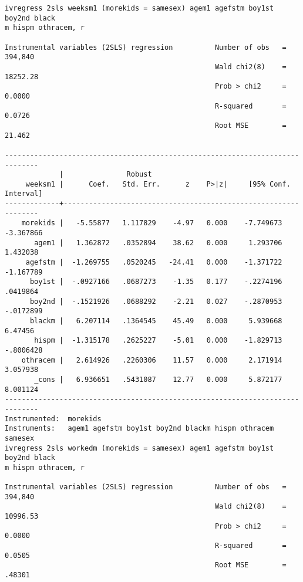 \documentclass[11pt]{article}
\begin{document}
\begin{verbatim}
ivregress 2sls weeksm1 (morekids = samesex) agem1 agefstm boy1st boy2nd black
m hispm othracem, r

Instrumental variables (2SLS) regression          Number of obs   =    394,840
                                                  Wald chi2(8)    =   18252.28
                                                  Prob > chi2     =     0.0000
                                                  R-squared       =     0.0726
                                                  Root MSE        =     21.462

------------------------------------------------------------------------------
             |               Robust
     weeksm1 |      Coef.   Std. Err.      z    P>|z|     [95% Conf. Interval]
-------------+----------------------------------------------------------------
    morekids |   -5.55877   1.117829    -4.97   0.000    -7.749673   -3.367866
       agem1 |   1.362872   .0352894    38.62   0.000     1.293706    1.432038
     agefstm |  -1.269755   .0520245   -24.41   0.000    -1.371722   -1.167789
      boy1st |  -.0927166   .0687273    -1.35   0.177    -.2274196    .0419864
      boy2nd |  -.1521926   .0688292    -2.21   0.027    -.2870953   -.0172899
      blackm |   6.207114   .1364545    45.49   0.000     5.939668     6.47456
       hispm |  -1.315178   .2625227    -5.01   0.000    -1.829713   -.8006428
    othracem |   2.614926   .2260306    11.57   0.000     2.171914    3.057938
       _cons |   6.936651   .5431087    12.77   0.000     5.872177    8.001124
------------------------------------------------------------------------------
Instrumented:  morekids
Instruments:   agem1 agefstm boy1st boy2nd blackm hispm othracem samesex
ivregress 2sls workedm (morekids = samesex) agem1 agefstm boy1st boy2nd black
m hispm othracem, r

Instrumental variables (2SLS) regression          Number of obs   =    394,840
                                                  Wald chi2(8)    =   10996.53
                                                  Prob > chi2     =     0.0000
                                                  R-squared       =     0.0505
                                                  Root MSE        =     .48301


\end{verbatim}
\end{document}
